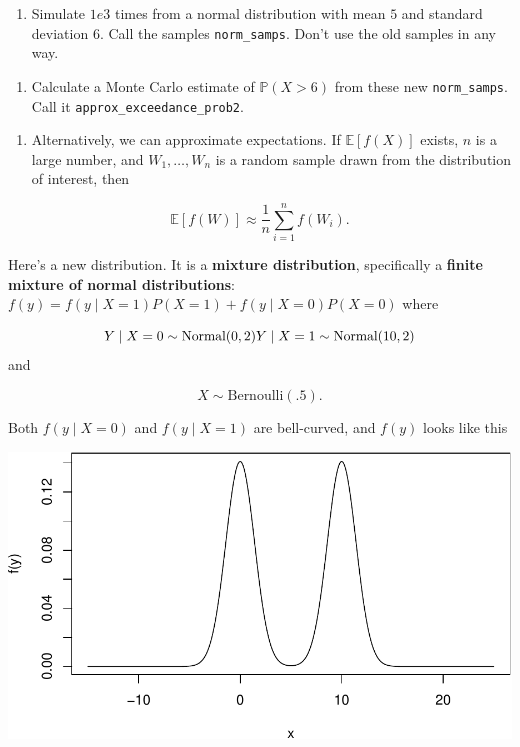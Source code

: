 \documentclass[
  12pt,
]{krantz}
\providecommand{\tightlist}{%
  \setlength{\itemsep}{0pt}\setlength{\parskip}{0pt}}
\begin{document}
\begin{enumerate}
\def\labelenumi{\arabic{enumi}.}
\setcounter{enumi}{3}
\tightlist
\item
  Simulate \(1e3\) times from a normal distribution with mean \(5\) and standard deviation \(6\). Call the samples \texttt{norm\_samps}. Don't use the old samples in any way.
\end{enumerate}

\begin{enumerate}
\def\labelenumi{\alph{enumi}.}
\setcounter{enumi}{3}
\tightlist
\item
  Calculate a Monte Carlo estimate of \(\mathbb{P}(X > 6)\) from these new \texttt{norm\_samps}. Call it \texttt{approx\_exceedance\_prob2}.
\end{enumerate}

\begin{enumerate}
\def\labelenumi{\arabic{enumi}.}
\setcounter{enumi}{3}
\tightlist
\item
  Alternatively, we can approximate expectations. If \(\mathbb{E}[f(X)]\) exists, \(n\) is a large number, and \(W_1, \ldots, W_n\) is a random sample drawn from the distribution of interest, then
\end{enumerate}

\[
\mathbb{E}[f(W)] \approx \frac{1}{n}\sum_{i=1}^n f(W_i).
\]

Here's a new distribution. It is a \textbf{mixture distribution}, specifically a \textbf{finite mixture of normal distributions}: \(f(y) = f(y \mid X=1)P(X=1) + f(y \mid X=0)P(X=0)\) where

\[
Y \mid X=0 \sim \text{Normal}(0, 2) \\
Y \mid X=1 \sim \text{Normal}(10, 2)
\]
and

\[
X \sim \text{Bernoulli}(.5).
\]

Both \(f(y \mid X=0)\) and \(f(y \mid X=1)\) are bell-curved, and \(f(y)\) looks like this

\begin{center}\includegraphics[width=0.5\linewidth]{r_and_python_book_files/figure-latex/unnamed-chunk-48-1} \end{center}
\end{document}
